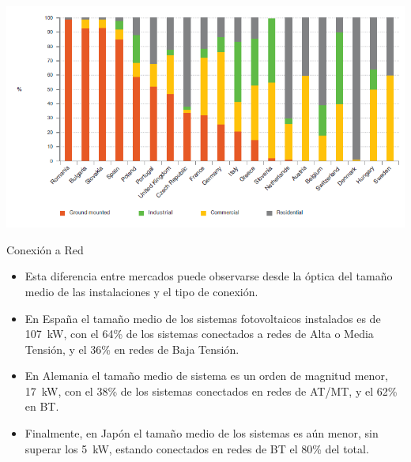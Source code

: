\documentclass[xcolor={usenames,svgnames,dvipsnames}]{beamer}
\begin{document}
\begin{frame}[label={sec:org65620aa}]{}
\begin{center}
\includegraphics[width=.9\linewidth]{../figs/SegmentacionFVEuropa_EPIA.png}
\end{center}
\end{frame}

\begin{frame}[label={sec:orgaf36cae}]{Conexión a Red}
\begin{itemize}
\item Esta diferencia entre mercados puede observarse desde la óptica del
tamaño medio de las instalaciones y el tipo de conexión.
\item En España el tamaño medio de los sistemas fotovoltaicos instalados
es de \SI{107}{\kilo\watt}, con el 64\% de los sistemas conectados a
redes de Alta o Media Tensión, y el 36\% en redes de Baja Tensión.
\item En Alemania el tamaño medio de sistema es un orden de magnitud
menor, \SI{17}{\kilo\watt}, con el 38\% de los sistemas conectados en
redes de AT/MT, y el 62\% en BT.
\item Finalmente, en Japón el tamaño medio de los sistemas es aún menor,
sin superar los \SI{5}{\kilo\watt}, estando conectados en redes de
BT el 80\% del total.
\end{itemize}
\end{frame}
\end{document}
